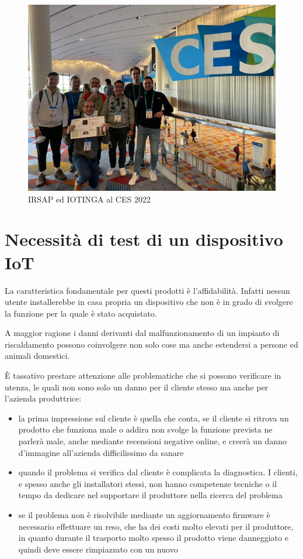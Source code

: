 \documentclass[12pt,a4paper,twoside,titlepage]{book}
\begin{document}
\begin{figure}[ht]
    \centering
    \includegraphics[width=12cm]{img/ces.jpeg}
    \caption{IRSAP ed IOTINGA al CES 2022}
    \label{fig:ces}
\end{figure}

\section{Necessità di test di un dispositivo IoT}

La caratteristica fondamentale per questi prodotti è l'affidabilità.
Infatti nessun utente installerebbe in casa propria un dispositivo che
non è in grado di svolgere la funzione per la quale è stato acquistato.

A maggior ragione i danni derivanti dal malfunzionamento di un impianto
di riscaldamento possono coinvolgere non solo cose ma anche estendersi
a persone ed animali domestici.

È tassativo prestare attenzione alle problematiche che si possono verificare
in utenza, le quali non sono solo un danno per il cliente stesso ma anche
per l'azienda produttrice:

\begin{itemize}
\item la prima impressione sul cliente è quella che conta, se il cliente si ritrova
    un prodotto che funziona male o addira non svolge la funzione prevista ne parlerà
    male, anche mediante recensioni negative online, e creerà un danno d'immagine all'azienda
    difficilissimo da sanare
\item quando il problema si verifica dal cliente è complicata la diagnostica. I clienti,
    e spesso anche gli installatori stessi, non hanno competenze tecniche o il
    tempo da dedicare nel supportare il produttore nella ricerca del problema
\item se il problema non è risolvibile mediante un aggiornamento \gls{firmware} è necessario
    effettuare un reso, che ha dei costi molto elevati per il produttore, in quanto
    durante il trasporto molto spesso il prodotto viene danneggiato e quindi deve
    essere rimpiazzato con un nuovo
\end{itemize}
\end{document}
